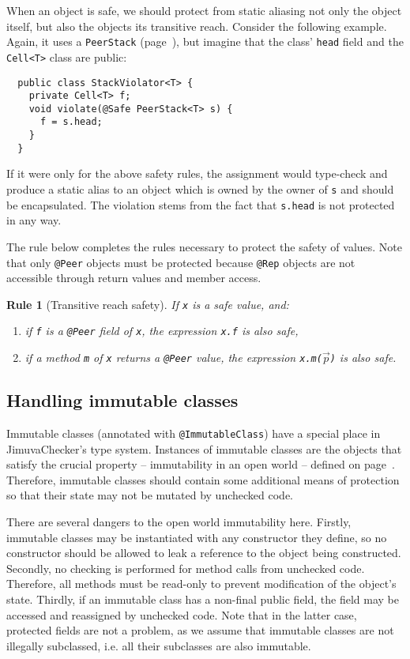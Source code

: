 \documentclass{pracamgr}
\theoremstyle{break}
\theoremstyle{break}
\theoremstyle{break}
\newtheorem{verrule}{Rule}
\begin{document}
When an object is safe, we should protect from static aliasing not
only the object itself, but also the objects its transitive reach.
Consider the following example. Again, it uses a \texttt{PeerStack}
(page~\pageref{lst:stack-peer}), but imagine that the class'
\texttt{head} field and the \texttt{Cell<T>} class are public:
\begin{lstlisting}
  public class StackViolator<T> {
    private Cell<T> f;
    void violate(@Safe PeerStack<T> s) {
      f = s.head;
    }
  }
\end{lstlisting}
If it were only for the above safety rules, the assignment would
type-check and produce a static alias to an object which is owned by
the owner of \texttt{s} and should be encapsulated. The violation
stems from the fact that \texttt{s.head} is not protected in any way.

The rule below completes the rules necessary to protect the safety of
values. Note that only \texttt{@Peer} objects must be protected
because \texttt{@Rep} objects are not accessible through return values
and member access.
\begin{verrule}[Transitive reach safety]
  If \texttt{x} is a safe value, and:
  \begin{enumerate}[label=(\arabic*)]
  \item if \texttt{f} is a \texttt{@Peer} field of \texttt{x}, the
    expression \texttt{x.f} is also safe, 
  \item if a method \texttt{m} of \texttt{x} returns a \texttt{@Peer}
    value, the expression \texttt{x.m($\vec{p}$)} is also safe. 
  \end{enumerate}
\end{verrule}

\subsection{Handling immutable classes}

Immutable classes (annotated with \texttt{@ImmutableClass}) have a
special place in JimuvaChecker's type system. Instances of immutable
classes are the objects that satisfy the crucial property --
immutability in an open world -- defined on
page~\pageref{inv:open}. Therefore, immutable classes should contain
some additional means of protection so that their state may not be
mutated by unchecked code.

There are several dangers to the open world immutability
here. Firstly, immutable classes may be instantiated with any
constructor they define, so no constructor should be allowed to leak a
reference to the object being constructed. Secondly, no checking is
performed for method calls from unchecked code. Therefore, all methods
must be read-only to prevent modification of the object's
state. Thirdly, if an immutable class has a non-final public field,
the field may be accessed and reassigned by unchecked code. Note that
in the latter case, protected fields are not a problem, as we assume
that immutable classes are not illegally subclassed, i.e. all their
subclasses are also immutable.
\end{document}
